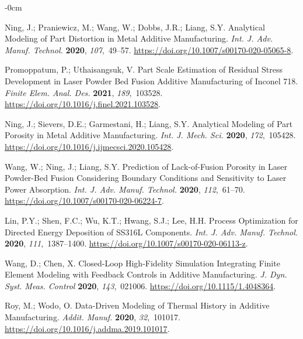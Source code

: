 \documentclass[metals,article,accept,pdftex,moreauthors]{Definitions/mdpi}
\begin{document}
\begin{adjustwidth}{-\extralength}{0cm}
\begin{thebibliography}{999}
Ning, J.; Praniewicz, M.; Wang, W.; Dobbs, J.R.; Liang, S.Y.
Analytical Modeling of Part Distortion in Metal Additive Manufacturing.
{\em  Int. J. Adv. Manuf. Technol.}
{\bf 2020}, {\em 107},~49--57.
{\url{https://doi.org/10.1007/s00170-020-05065-8}}.

Promoppatum, P.; Uthaisangsuk, V.
Part Scale Estimation of Residual Stress Development in Laser Powder Bed Fusion Additive Manufacturing of Inconel 718. {\em Finite Elem. Anal. Des.} {\bf 2021}, {\em 189},~103528.
{\url{https://doi.org/10.1016/j.finel.2021.103528}}.

Ning, J.; Sievers, D.E.; Garmestani, H.; Liang, S.Y.
Analytical Modeling of Part Porosity in Metal Additive Manufacturing.
{\em Int. J. Mech. Sci.} {\bf 2020}, {\em 172},~105428.
{\url{https://doi.org/10.1016/j.ijmecsci.2020.105428}}.

Wang, W.; Ning, J.; Liang, S.Y.
Prediction of Lack-of-Fusion Porosity in Laser Powder-Bed Fusion Considering Boundary Conditions and Sensitivity to Laser Power Absorption.
{\em  Int. J. Adv. Manuf. Technol.}
{\bf 2020}, {\em 112},~61--70.
{\url{https://doi.org/10.1007/s00170-020-06224-7}}.

Lin, P.Y.; Shen, F.C.; Wu, K.T.; Hwang, S.J.; Lee, H.H.
Process Optimization for Directed Energy Deposition of {{SS316L}} Components.
{\em  Int. J. Adv. Manuf. Technol.}
{\bf 2020}, {\em 111},~1387--1400.
{\url{https://doi.org/10.1007/s00170-020-06113-z}}.

Wang, D.; Chen, X.
Closed-{{Loop High-Fidelity Simulation Integrating Finite Element Modeling with Feedback Controls}} in {{Additive Manufacturing}}.
{\em J. Dyn. Syst. Meas. Control} {\bf 2020}, {\em 143},~021006.
{\url{https://doi.org/10.1115/1.4048364}}.

Roy, M.; Wodo, O.
Data-Driven Modeling of Thermal History in Additive Manufacturing.
{\em Addit. Manuf.} {\bf 2020}, {\em 32},~101017.
{\url{https://doi.org/10.1016/j.addma.2019.101017}}.


\end{thebibliography}
\end{adjustwidth}
\end{document}
